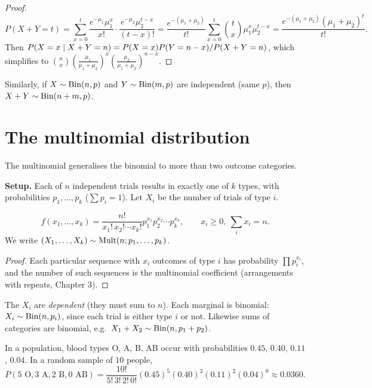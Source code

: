 \begin{proof}
\[
  P(X+Y = t) = \sum_{x=0}^t \frac{e^{-\mu_1}\mu_1^x}{x!}\cdot\frac{e^{-\mu_2}\mu_2^{t-x}}{(t-x)!}
  = \frac{e^{-(\mu_1+\mu_2)}}{t!}\sum_{x=0}^t\binom tx\mu_1^x\mu_2^{t-x}
  = \frac{e^{-(\mu_1+\mu_2)}(\mu_1+\mu_2)^t}{t!}.
\]
Then $P(X = x\mid X+Y = n) = P(X=x)P(Y=n-x)/P(X+Y=n)$, which simplifies to
$\binom nx \left(\frac{\mu_1}{\mu_1+\mu_2}\right)^x\left(\frac{\mu_2}{\mu_1+\mu_2}\right)^{n-x}$.
\end{proof}

Similarly, if $X\sim\operatorname{Bin}(n,p)$ and $Y\sim\operatorname{Bin}(m,p)$ are independent (same $p$), then
$X+Y\sim\operatorname{Bin}(n+m,p)$.

\section{The multinomial distribution}

The multinomial generalises the binomial to more than two outcome categories.

\textbf{Setup.} Each of $n$ independent trials results in exactly one of $k$ types, with
probabilities $p_1,\dots,p_k$ ($\sum p_i = 1$). Let $X_i$ be the number of trials of type
$i$.

\begin{theorem}[Multinomial p.f.]
\[
  f(x_1,\dots,x_k) = \frac{n!}{x_1!\,x_2!\cdots x_k!}p_1^{x_1}p_2^{x_2}\cdots p_k^{x_k},
  \qquad x_i\ge 0,\ \sum_i x_i = n.
\]
We write $(X_1,\dots,X_k)\sim\operatorname{Mult}(n; p_1,\dots,p_k)$.
\end{theorem}

\begin{proof}
Each particular sequence with $x_i$ outcomes of type $i$ has probability
$\prod p_i^{x_i}$, and the number of such sequences is the multinomial coefficient
(arrangements with repeats, Chapter 3).
\end{proof}

The $X_i$ are \emph{dependent} (they must sum to $n$). Each marginal is binomial:
$X_i\sim\operatorname{Bin}(n,p_i)$, since each trial is either type $i$ or not. Likewise sums of
categories are binomial, e.g.\ $X_1 + X_2\sim\operatorname{Bin}(n, p_1+p_2)$.

\begin{example}
In a population, blood types O, A, B, AB occur with probabilities $0.45$, $0.40$, $0.11$,
$0.04$. In a random sample of $10$ people,
\[
  P(5\text{ O}, 3\text{ A}, 2\text{ B}, 0\text{ AB}) = \frac{10!}{5!\,3!\,2!\,0!}
  (0.45)^5(0.40)^3(0.11)^2(0.04)^0 \approx 0.0360.
\]
\end{example}

